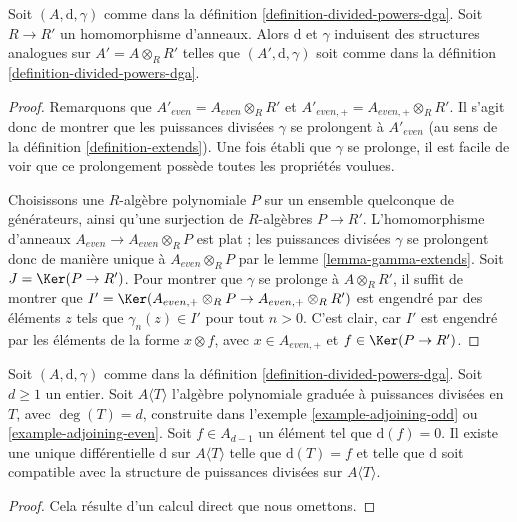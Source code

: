 \begin{lemma}
\label{lemma-base-change-div}
Soit $(A, \text{d}, \gamma)$ comme dans la définition
\ref{definition-divided-powers-dga}. Soit $R \to R'$ un homomorphisme
d'anneaux. Alors $\text{d}$ et $\gamma$ induisent des structures analogues
sur $A' = A \otimes_R R'$ telles que $(A', \text{d}, \gamma)$ soit comme
dans la définition \ref{definition-divided-powers-dga}.
\end{lemma}

\begin{proof}
Remarquons que $A'_{even} = A_{even} \otimes_R R'$ et
$A'_{even, +} = A_{even, +} \otimes_R R'$. Il s'agit donc de montrer que
les puissances divisées $\gamma$ se prolongent à $A'_{even}$ (au sens de la
définition \ref{definition-extends}). Une fois établi que $\gamma$ se
prolonge, il est facile de voir que ce prolongement possède toutes les
propriétés voulues.

\medskip\noindent
Choisissons une $R$-algèbre polynomiale $P$ sur un ensemble quelconque de
générateurs, ainsi qu'une surjection de $R$-algèbres
$P \to R'$. L'homomorphisme d'anneaux
$A_{even} \to A_{even} \otimes_R P$ est plat ; les puissances divisées
$\gamma$ se prolongent donc de manière unique à
$A_{even} \otimes_R P$ par le lemme \ref{lemma-gamma-extends}.
Soit $J = \Ker(P \to R')$. Pour montrer que $\gamma$ se prolonge à
$A \otimes_R R'$, il suffit de montrer que
$I' = \Ker(A_{even, +} \otimes_R P \to A_{even, +} \otimes_R R')$
est engendré par des éléments $z$ tels que $\gamma_n(z) \in I'$ pour tout
$n > 0$. C'est clair, car $I'$ est engendré par les éléments de la forme
$x \otimes f$, avec $x \in A_{even, +}$ et $f \in \Ker(P \to R')$.
\end{proof}

\begin{lemma}
\label{lemma-extend-differential}
Soit $(A, \text{d}, \gamma)$ comme dans la définition
\ref{definition-divided-powers-dga}. Soit $d \geq 1$ un entier. Soit
$A\langle T \rangle$ l'algèbre polynomiale graduée à puissances divisées en
$T$, avec $\deg(T) = d$, construite dans l'exemple
\ref{example-adjoining-odd} ou \ref{example-adjoining-even}.
Soit $f \in A_{d - 1}$ un élément tel que $\text{d}(f) = 0$. Il existe une
unique différentielle $\text{d}$ sur $A\langle T\rangle$ telle que
$\text{d}(T) = f$ et telle que $\text{d}$ soit compatible avec la structure
de puissances divisées sur $A\langle T \rangle$.
\end{lemma}

\begin{proof}
Cela résulte d'un calcul direct que nous omettons.
\end{proof}

